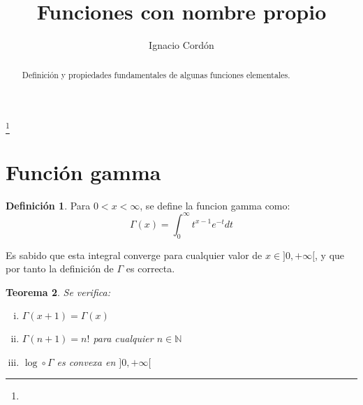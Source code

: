 \documentclass[a4paper, 11pt]{amsart}
\newtheorem{theorem}{Teorema}[section]
\theoremstyle{definition}
\newtheorem{definition}[theorem]{Definición}
\theoremstyle{remark}
\numberwithin{equation}{section}
\begin{document}
\title{Funciones con nombre propio}


\author{Ignacio Cordón}
\address{}
\curraddr{}
\email{}
\thanks{}


\keywords{}

\date{}

\dedicatory{}


\begin{abstract}
  Definición y propiedades fundamentales de algunas funciones elementales.
\end{abstract}

\maketitle

  \section{Función gamma}
  
  \begin{definition}
  Para $0 < x < \infty$, se define la funcion gamma como: 
    \begin{equation}
      \Gamma(x) = \int_0^{\infty}{t^{x-1}e^{-t}dt}
      \label{gamma}
    \end{equation}
  \end{definition}
  
  Es sabido que esta integral converge para cualquier valor de $x\in]0,+\infty[$, y que por tanto la definición de 
  $\Gamma$ es correcta.\\
  
  \begin{theorem}
    Se verifica:
      \begin{enumerate}[(i)]
	\item $\Gamma(x+1) = \Gamma(x)$
	\item $\Gamma(n+1) = n!$ para cualquier $n\in \mathbb{N}$
	\item $\log \circ \Gamma$ es convexa en $]0,+\infty[$
      \end{enumerate}
  \end{theorem}
  
\end{document}
